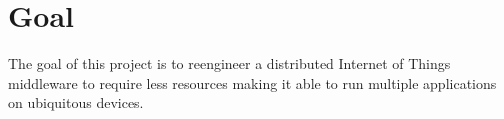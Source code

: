 \section{Goal}
The goal of this project is to reengineer a distributed Internet of Things middleware to require less resources making it able to run multiple applications on ubiquitous devices. 